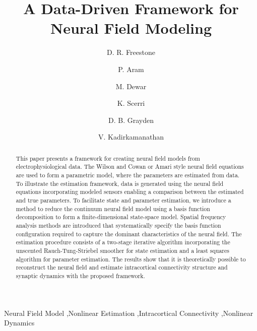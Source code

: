 \documentclass[review,authoryear,3p]{elsarticle}
\begin{document}
\begin{frontmatter}
\title{A Data-Driven Framework for Neural Field Modeling}

\author[DEEE,BEI,UE]{D. R. Freestone  }
\author[US]{P. Aram} 
\author[UE,CU]{M. Dewar}
\author[UM]{K. Scerri}
\author[DEEE,BEI]{D. B. Grayden}
\author[US]{V. Kadirkamanathan}

\address[DEEE]{Department of Electrical and Electronic Engineering, University of Melbourne, Melbourne, VIC, Australia}
\address[BEI]{The Bionic Ear Institute, East Melbourne, VIC, Australia}
\address[UE]{Institute for Adaptive and Neural Computation, University of Edinburgh, Edinburgh, UK}
\address[US]{Department of Automatic Control and Systems Engineering, University of Sheffield, Sheffield, UK}
\address[CU]{Department of Applied Physics and Applied Mathematics, Columbia University, New York, NY, USA}
\address[UM]{Department of Systems and Control Engineering, University of Malta, Msida, MSD, Malta}


\begin{abstract}
This paper presents a framework for creating neural field models from electrophysiological data. The Wilson and Cowan or Amari style neural field equations are used to form a parametric model, where the parameters are estimated from data. To illustrate the estimation framework, data is generated using the neural field equations incorporating modeled sensors enabling a comparison between the estimated and true parameters. To facilitate state and parameter estimation, we introduce a method to reduce the continuum neural field model using a basis function decomposition to form a finite-dimensional state-space model. Spatial frequency analysis methods are introduced that systematically specify the basis function configuration required to capture the dominant characteristics of the neural field. The estimation procedure consists of a two-stage iterative algorithm incorporating the unscented Rauch-Tung-Striebel smoother for state estimation and a least squares algorithm for parameter estimation. The results show that it is theoretically possible to reconstruct the neural field and estimate intracortical connectivity structure and synaptic dynamics with the proposed framework. 
\end{abstract}

\begin{keyword}
	Neural Field Model \sep Nonlinear Estimation \sep Intracortical Connectivity \sep Nonlinear Dynamics
\end{keyword}

\end{frontmatter}
\end{document}
